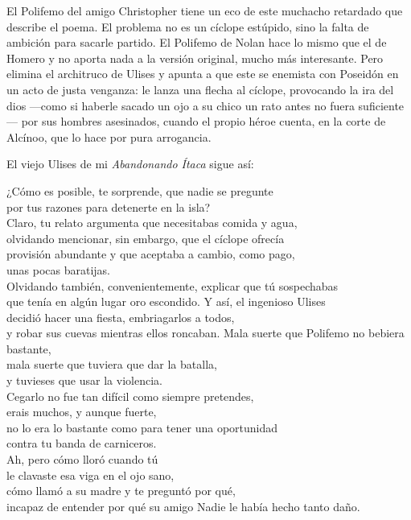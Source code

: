 El Polifemo del amigo Christopher tiene un eco de este muchacho retardado que describe el poema. El problema no es un cíclope estúpido, sino la falta de ambición para sacarle partido. El Polifemo de Nolan hace lo mismo que el de Homero y no aporta nada a la versión original, mucho más interesante. Pero elimina el architruco de Ulises y apunta a que este se enemista con Poseidón en un acto de justa venganza: le lanza una flecha al cíclope, provocando la ira del dios ---como si haberle sacado un ojo a su chico un rato antes no fuera suficiente--- por sus hombres asesinados, cuando el propio héroe cuenta, en la corte de Alcínoo, que lo hace por pura arrogancia.

El viejo Ulises de mi \emph{Abandonando Ítaca} sigue así:

\begin{versopropio}
¿Cómo es posible, te sorprende, que nadie se pregunte\\
por tus razones para detenerte en la isla?\\
Claro, tu relato argumenta que necesitabas comida y agua,\\
olvidando mencionar, sin embargo, que el cíclope ofrecía\\
provisión abundante y que aceptaba a cambio, como pago,\\
unas pocas baratijas.\\
Olvidando también, convenientemente, explicar que tú sospechabas\\
que tenía en algún lugar oro escondido. Y así, el ingenioso Ulises\\
decidió hacer una fiesta, embriagarlos a todos,\\
y robar sus cuevas mientras ellos roncaban.
\stanzabreak
Mala suerte que Polifemo no bebiera bastante,\\
mala suerte que tuviera que dar la batalla,\\
y tuvieses que usar la violencia.\\
Cegarlo no fue tan difícil como siempre pretendes,\\
erais muchos, y aunque fuerte,\\
no lo era lo bastante como para tener una oportunidad\\
contra tu banda de carniceros.\\
Ah, pero cómo lloró cuando tú\\
le clavaste esa viga en el ojo sano,\\
cómo llamó a su madre y te preguntó por qué,\\
incapaz de entender por qué su amigo Nadie le había hecho tanto daño.

\end{versopropio}
